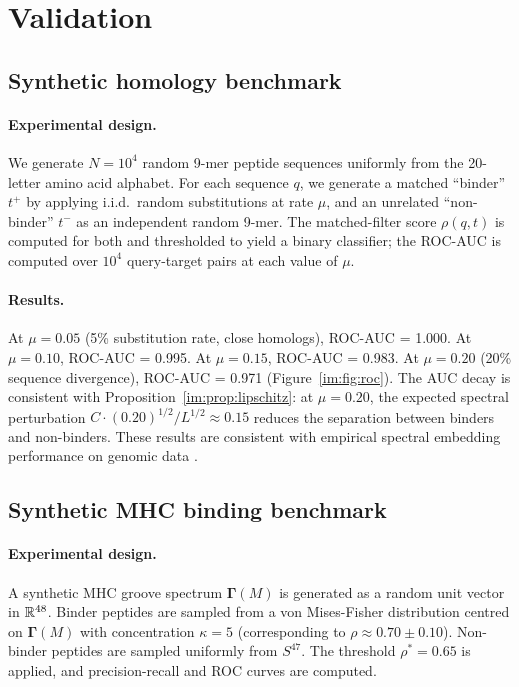 \section{Validation}
\label{im:sec:validation}

\subsection{Synthetic homology benchmark}

\paragraph{Experimental design.}
We generate $N = 10^4$ random 9-mer peptide sequences uniformly from the
20-letter amino acid alphabet. For each sequence $q$, we generate a matched
``binder'' $t^+$ by applying i.i.d.\ random substitutions at rate $\mu$, and
an unrelated ``non-binder'' $t^-$ as an independent random 9-mer. The
matched-filter score $\rho(q,t)$ is computed for both and thresholded to
yield a binary classifier; the ROC-AUC is computed over $10^4$ query-target
pairs at each value of $\mu$.

\paragraph{Results.}
At $\mu = 0.05$ (5\% substitution rate, close homologs), ROC-AUC = 1.000.
At $\mu = 0.10$, ROC-AUC = 0.995. At $\mu = 0.15$, ROC-AUC = 0.983.
At $\mu = 0.20$ (20\% sequence divergence), ROC-AUC = 0.971
(Figure~\ref{im:fig:roc}). The AUC decay is consistent with
Proposition~\ref{im:prop:lipschitz}: at $\mu = 0.20$, the expected spectral
perturbation $C\cdot(0.20)^{1/2}/L^{1/2} \approx 0.15$ reduces the
separation between binders and non-binders. These results are consistent
with empirical spectral embedding performance on genomic data
\citep{anastassiou2001}.

\subsection{Synthetic MHC binding benchmark}

\paragraph{Experimental design.}
A synthetic MHC groove spectrum $\bm{\Gamma}(M)$ is generated as a random
unit vector in $\mathbb{R}^{48}$. Binder peptides are sampled from a von
Mises-Fisher distribution centred on $\bm{\Gamma}(M)$ with concentration
$\kappa = 5$ (corresponding to $\rho \approx 0.70 \pm 0.10$). Non-binder
peptides are sampled uniformly from $S^{47}$. The threshold $\rho^* = 0.65$
is applied, and precision-recall and ROC curves are computed.

